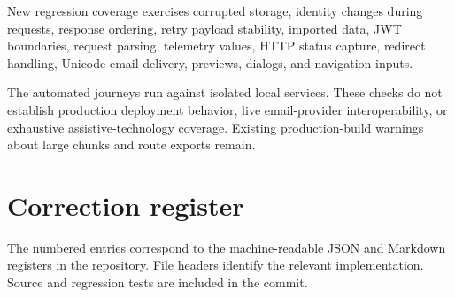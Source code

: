 \documentclass[10pt,a4paper]{article}
\begin{document}
New regression coverage exercises corrupted storage, identity changes during requests, response ordering, retry payload stability, imported data, JWT boundaries, request parsing, telemetry values, HTTP status capture, redirect handling, Unicode email delivery, previews, dialogs, and navigation inputs.

The automated journeys run against isolated local services. These checks do not establish production deployment behavior, live email-provider interoperability, or exhaustive assistive-technology coverage. Existing production-build warnings about large chunks and route exports remain.

\section{Correction register}
The numbered entries correspond to the machine-readable JSON and Markdown registers in the repository. File headers identify the relevant implementation. Source and regression tests are included in the commit.
\end{document}
